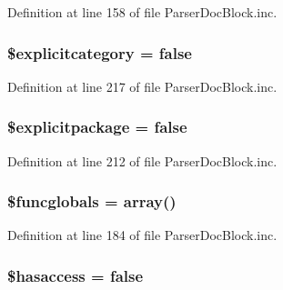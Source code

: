 \-Definition at line 158 of file \-Parser\-Doc\-Block.\-inc.

\hypertarget{classparser_doc_block_ae9ebdac226fc1207ab28d68db8ecc5cc}{
\subsubsection[{\$explicitcategory}]{\setlength{\rightskip}{0pt plus 5cm}\$explicitcategory = false}}\label{classparser_doc_block_ae9ebdac226fc1207ab28d68db8ecc5cc}


\-Definition at line 217 of file \-Parser\-Doc\-Block.\-inc.

\hypertarget{classparser_doc_block_a807142a46449e6b19f60f956580bbb23}{
\subsubsection[{\$explicitpackage}]{\setlength{\rightskip}{0pt plus 5cm}\$explicitpackage = false}}\label{classparser_doc_block_a807142a46449e6b19f60f956580bbb23}


\-Definition at line 212 of file \-Parser\-Doc\-Block.\-inc.

\hypertarget{classparser_doc_block_ae2547859cc606098a4bf54f7fbfbf9f4}{
\subsubsection[{\$funcglobals}]{\setlength{\rightskip}{0pt plus 5cm}\$funcglobals = array()}}\label{classparser_doc_block_ae2547859cc606098a4bf54f7fbfbf9f4}


\-Definition at line 184 of file \-Parser\-Doc\-Block.\-inc.

\hypertarget{classparser_doc_block_aad31327fa662a2b714b5926472228c8b}{
\subsubsection[{\$hasaccess}]{\setlength{\rightskip}{0pt plus 5cm}\$hasaccess = false}}\label{classparser_doc_block_aad31327fa662a2b714b5926472228c8b}


